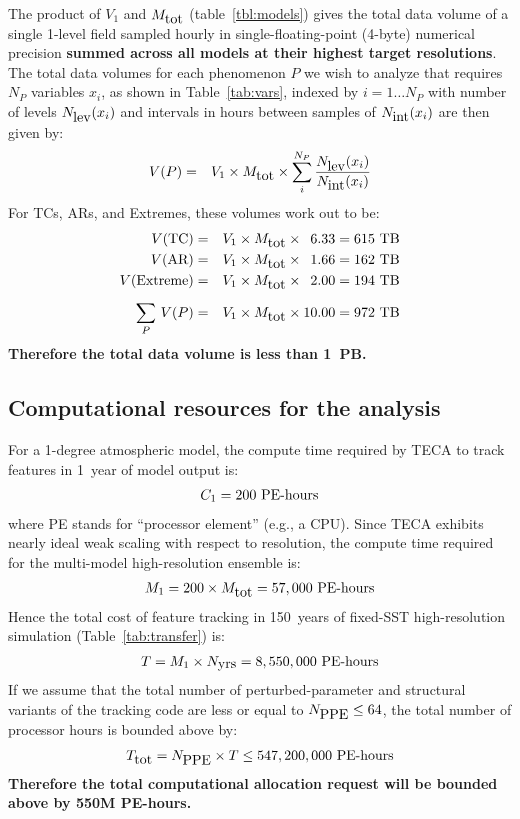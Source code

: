 \documentclass[11pt]{article}
\begin{document}
The product of $V_1$ and $M_{\hbox{tot}}$ (table~\ref{tbl:models}) gives the total data volume  of a single 1-level field sampled hourly in single-floating-point (4-byte) numerical precision
{\textbf{summed across all models at their highest target resolutions}}.  The total data volumes for each phenomenon $P$ we wish to analyze that requires $N_P$ variables $x_i$, as shown in Table~\ref{tab:vars}, indexed by $i=1 \ldots N_P$ with
number of levels $N_{\hbox{lev}}(x_i)$ and intervals in hours between samples of $N_{\hbox{int}}(x_i)$ are then given by:
\begin{eqnarray*}
V(P) & = & V_1 \times M_{\hbox{tot}} \times \sum_i^{N_P} \frac{N_{\hbox{lev}}(x_i)}{N_{\hbox{int}}(x_i)}\\
\end{eqnarray*}
For TCs, ARs, and Extremes, these volumes work out to be:
\begin{eqnarray*}
V(\hbox{TC}) & = & V_1 \times M_{\hbox{tot}} \times \phantom{1}6.33 = 615\ \hbox{TB}\\
V(\hbox{AR}) & = & V_1 \times M_{\hbox{tot}} \times \phantom{1}1.66 = 162\ \hbox{TB}\\
V(\hbox{Extreme}) & = & V_1 \times M_{\hbox{tot}} \times \phantom{1}2.00 =  194\ \hbox{TB}\\*[5pt]
\sum_P\,V(P) & = & V_1 \times M_{\hbox{tot}} \times 10.00 = 972\ \hbox{TB} 
\end{eqnarray*}
\textbf{Therefore the total data volume is less than 1~PB.}

\subsection{Computational resources for the analysis}
\label{ssec:allocation}

For a 1-degree atmospheric model, the compute time required by TECA to track features in 1~year of model output is:
\begin{eqnarray*}
C_1 = 200\ \hbox{PE-hours}
\end{eqnarray*}
where PE stands for ``processor element'' (e.g., a CPU).  
Since TECA exhibits nearly ideal weak scaling with respect to resolution, the compute time required for the multi-model high-resolution ensemble is:   
\begin{eqnarray*}
M_1  = 200 \times M_{\hbox{tot}} = 57,000\ \hbox{PE-hours}
\end{eqnarray*}
Hence the total cost of feature tracking in 150~years of fixed-SST high-resolution simulation (Table~\ref{tab:transfer}) is:
\begin{eqnarray*}
T  = M_1 \times N_{\hbox{yrs}} = 8,550,000\ \hbox{PE-hours}
\end{eqnarray*}
If we assume that the total number of perturbed-parameter and structural variants of the tracking code are less or equal to $N_{\hbox{PPE}} \le 64$, the total number of processor hours is bounded above by:
\begin{eqnarray*}
T_{\hbox{tot}}  = N_{\hbox{PPE}} \times  T \le 547,200,000\ \hbox{PE-hours}
\end{eqnarray*}
\textbf{Therefore the total computational allocation request will be bounded above by 550M PE-hours.}
\end{document}
